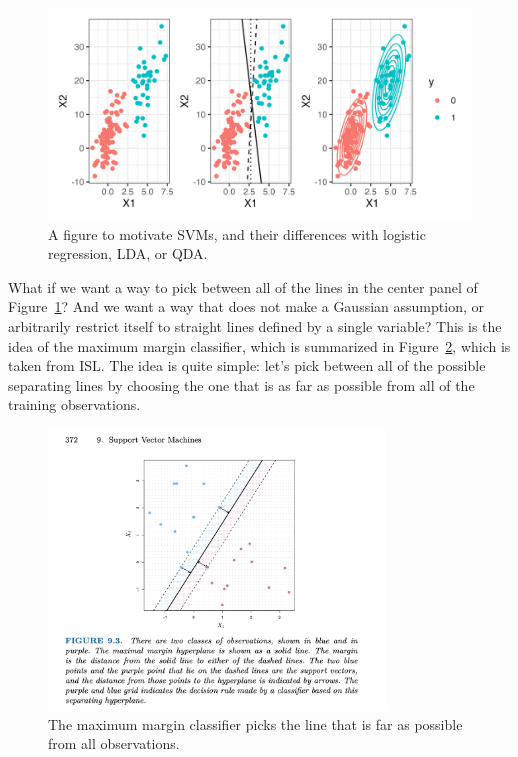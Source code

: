 \begin{figure}
\includegraphics[width=\textwidth]{442_lecs/svm_raw.png}
\caption{A figure to motivate SVMs, and their differences with logistic regression, LDA, or QDA.}
\label{fig_svm}
\end{figure}

What if we want a way to pick between all of the lines in the center panel of Figure~\ref{fig_svm}? And we want a way that does not make a Gaussian assumption, or arbitrarily restrict itself to straight lines defined by a single variable? This is the idea of the maximum margin classifier, which is summarized in Figure~\ref{fig_svm2}, which is taken from ISL. The idea is quite simple: let's pick between all of the possible separating lines by choosing the one that is as far as possible from all of the training observations. 

\begin{figure}
\includegraphics[width=0.8\textwidth]{442_lecs/svm.png}
\caption{The maximum margin classifier picks the line that is far as possible from all observations.}
\label{fig_svm2}
\end{figure}

